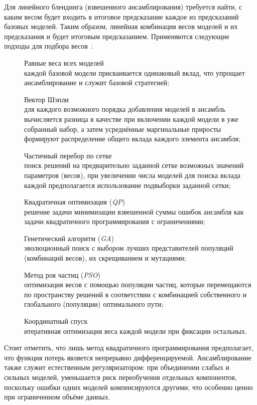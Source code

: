Для линейного блендинга (взвешенного ансамблирования) требуется найти, с каким весом будет входить в итоговое предсказание каждое из предсказаний базовых моделей. Таким образом, линейная комбинация весов моделей и их предсказания и будет итоговым предсказанием. Применяются следующие подходы для подбора весов~\cite{Bischl}:
\begin{description}
    \item[\textbullet] Равные веса всех моделей \\
    каждой базовой модели присваивается одинаковый вклад, что упрощает ансамблирование и служит базовой стратегией;
    \item[\textbullet] Вектор Шэпли~\cite{Sofiane}\\
    для каждого возможного порядка добавления моделей в ансамбль вычисляется разница в качестве при включении каждой модели в уже собранный набор, а затем усреднённые маргинальные приросты формируют распределение общего вклада каждого элемента ансамбля;
    \item[\textbullet] Частичный перебор по сетке\\
    поиск решений на предварительно заданной сетке возможных значений параметров (весов), при увеличении числа моделей для поиска вклада каждой предполагается использование подвыборки заданной сетки;
    \item[\textbullet] Квадратичная оптимизация (\emph{QP})\\
    решение задачи минимизации взвешенной суммы ошибок \mbox{ансамбля} как задачи квадратичного программирования с ограничениями;
    \item[\textbullet] Генетический алгоритм (\emph{GA})\\
    эволюционный поиск с выбором лучших представителей популяций (комбинаций весов), их скрещиванием и мутациями;
    \item[\textbullet] Метод роя частиц (\emph{PSO})~\cite{YouGui}\\
    оптимизация весов с помощью популяции частиц, которые перемещаются по пространству решений в соответствии с комбинацией собственного и глобального (популяции) оптимального пути;
    \item[\textbullet] Координатный спуск\\
    итеративная оптимизация веса каждой модели при фиксации остальных.
\end{description}
Стоит отметить, что лишь метод квадратичного программирования предполагает, что функция потерь является непрерывно дифференцируемой. Ансамблирование также служит естественным регуляризатором: при объединении слабых и сильных моделей, уменьшается риск переобучения отдельных компонентов, поскольку ошибки одних моделей компенсируются другими, что особенно ценно при ограниченном объёме данных.


